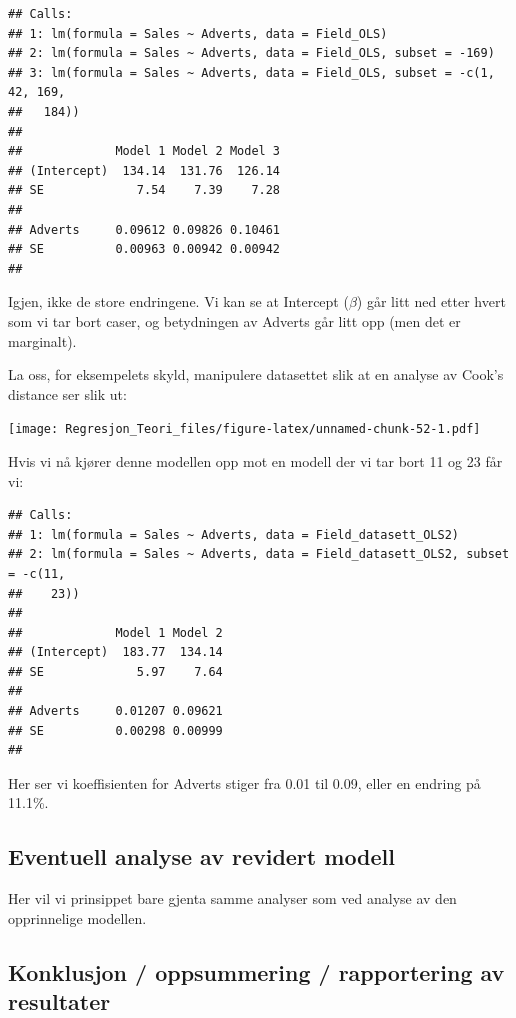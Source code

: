 \documentclass[
]{article}
\begin{document}
\begin{verbatim}
## Calls:
## 1: lm(formula = Sales ~ Adverts, data = Field_OLS)
## 2: lm(formula = Sales ~ Adverts, data = Field_OLS, subset = -169)
## 3: lm(formula = Sales ~ Adverts, data = Field_OLS, subset = -c(1, 42, 169, 
##   184))
## 
##             Model 1 Model 2 Model 3
## (Intercept)  134.14  131.76  126.14
## SE             7.54    7.39    7.28
##                                    
## Adverts     0.09612 0.09826 0.10461
## SE          0.00963 0.00942 0.00942
## 
\end{verbatim}

Igjen, ikke de store endringene. Vi kan se at Intercept (\(\beta\)) går
litt ned etter hvert som vi tar bort caser, og betydningen av Adverts
går litt opp (men det er marginalt).

La oss, for eksempelets skyld, manipulere datasettet slik at en analyse
av Cook's distance ser slik ut:

\texttt{[image: Regresjon\_Teori\_files/figure-latex/unnamed-chunk-52-1.pdf]}

Hvis vi nå kjører denne modellen opp mot en modell der vi tar bort 11 og
23 får vi:

\begin{verbatim}
## Calls:
## 1: lm(formula = Sales ~ Adverts, data = Field_datasett_OLS2)
## 2: lm(formula = Sales ~ Adverts, data = Field_datasett_OLS2, subset = -c(11,
##    23))
## 
##             Model 1 Model 2
## (Intercept)  183.77  134.14
## SE             5.97    7.64
##                            
## Adverts     0.01207 0.09621
## SE          0.00298 0.00999
## 
\end{verbatim}

Her ser vi koeffisienten for Adverts stiger fra 0.01 til 0.09, eller en
endring på 11.1\%.

\hypertarget{eventuell-analyse-av-revidert-modell}{%
\subsection{Eventuell analyse av revidert
modell}\label{eventuell-analyse-av-revidert-modell}}

Her vil vi prinsippet bare gjenta samme analyser som ved analyse av den
opprinnelige modellen.

\hypertarget{konklusjon-oppsummering-rapportering-av-resultater}{%
\subsection{Konklusjon / oppsummering / rapportering av
resultater}\label{konklusjon-oppsummering-rapportering-av-resultater}}
\end{document}
